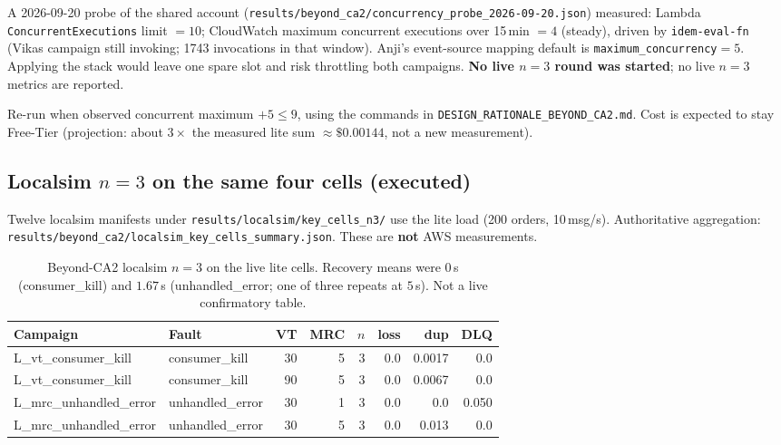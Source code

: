 A 2026-09-20 probe of the shared account (\texttt{results/beyond\_ca2/concurrency\_probe\_2026-09-20.json}) measured: Lambda \texttt{ConcurrentExecutions} limit $=10$; CloudWatch maximum concurrent executions over 15\,min $=4$ (steady), driven by \texttt{idem-eval-fn} (Vikas campaign still invoking; 1743 invocations in that window). Anji's event-source mapping default is \texttt{maximum\_concurrency}$=5$. Applying the stack would leave one spare slot and risk throttling both campaigns. \textbf{No live $n{=}3$ round was started}; no live $n{=}3$ metrics are reported.

Re-run when observed concurrent maximum $+5 \le 9$, using the commands in \texttt{DESIGN\_RATIONALE\_BEYOND\_CA2.md}. Cost is expected to stay Free-Tier (projection: about $3\times$ the measured lite sum $\approx\$0.00144$, not a new measurement).

\subsection{Localsim $n{=}3$ on the same four cells (executed)}

Twelve localsim manifests under \texttt{results/localsim/key\_cells\_n3/} use the lite load (200 orders, 10\,msg/s). Authoritative aggregation: \texttt{results/beyond\_ca2/localsim\_key\_cells\_summary.json}. These are \textbf{not} AWS measurements.

\begin{table}[h]
\centering
\begin{tabular}{llrrrrrr}
\hline
\textbf{Campaign} & \textbf{Fault} & \textbf{VT} & \textbf{MRC} & \textbf{$n$} & \textbf{loss} & \textbf{dup} & \textbf{DLQ} \\
\hline
L\_vt\_consumer\_kill & consumer\_kill & 30 & 5 & 3 & 0.0 & 0.0017 & 0.0 \\
L\_vt\_consumer\_kill & consumer\_kill & 90 & 5 & 3 & 0.0 & 0.0067 & 0.0 \\
L\_mrc\_unhandled\_error & unhandled\_error & 30 & 1 & 3 & 0.0 & 0.0 & 0.050 \\
L\_mrc\_unhandled\_error & unhandled\_error & 30 & 5 & 3 & 0.0 & 0.013 & 0.0 \\
\hline
\end{tabular}
\caption{Beyond-CA2 localsim $n{=}3$ on the live lite cells. Recovery means were $0$\,s (consumer\_kill) and $1.67$\,s (unhandled\_error; one of three repeats at $5$\,s). Not a live confirmatory table.}
\end{table}


